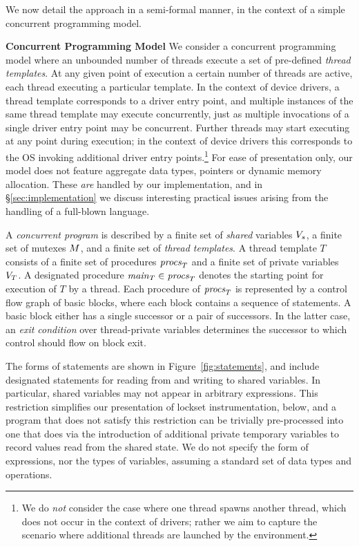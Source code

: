We now detail the approach in a semi-formal manner, in the context of a simple concurrent programming model.

\noindent\textbf{Concurrent Programming Model }
%
We consider a concurrent programming model where an unbounded number of threads execute a set of pre-defined \emph{thread templates}.  At any given point of execution a certain number of threads are active, each thread executing a particular template.  In the context of device drivers, a thread template corresponds to a driver entry point, and multiple instances of the same thread template may execute concurrently, just as multiple invocations of a single driver entry point may be concurrent.  Further threads may start executing at any point during execution; in the context of device drivers this corresponds to the OS invoking additional driver entry points.\footnote{We do \emph{not} consider the case where one thread spawns another thread, which does not occur in the context of drivers; rather we aim to capture the scenario where additional threads are launched by the environment.}  For ease of presentation only, our model does not feature aggregate data types, pointers or dynamic memory allocation.  These \emph{are} handled by our implementation, and in \S\ref{sec:implementation} we discuss interesting practical issues arising from the handling of a full-blown language.

A \emph{concurrent program} is described by a finite set of \emph{shared} variables $V_s$, a finite set of mutexes $M$, and a finite set of \emph{thread templates}.  A thread template $T$ consists of a finite set of procedures $\mathit{procs}_{T}$ and a finite set of private variables $V_{T}$.  A designated procedure $\mathit{main}_{T} \in \mathit{procs}_{T}$ denotes the starting point for execution of $T$ by a thread.  Each procedure of $\mathit{procs}_{T}$ is represented by a control flow graph of basic blocks, where each block contains a sequence of statements.  A basic block either has a single successor or a pair of successors.  In the latter case, an \emph{exit condition} over thread-private variables determines the successor to which control should flow on block exit.

The forms of statements are shown in Figure~\ref{fig:statements}, and include designated statements for reading from and writing to shared variables.  In particular, shared variables may not appear in arbitrary expressions.  This restriction simplifies our presentation of lockset instrumentation, below, and a program that does not satisfy this restriction can be trivially pre-processed into one that does via the introduction of additional private temporary variables to record values read from the shared state.  We do not specify the form of expressions, nor the types of variables, assuming a standard set of data types and operations.


